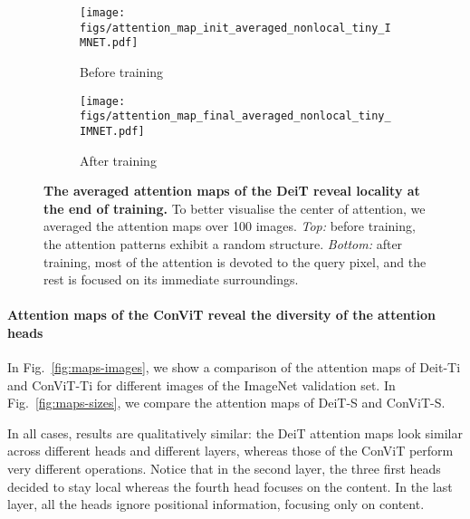 \documentclass[a4paper,11pt,twocolumn]{article}
\begin{document}
\begin{figure}[htb]
    \centering
    \begin{subfigure}[b]{.49\columnwidth}
    \texttt{[image: figs/attention\_map\_init\_averaged\_nonlocal\_tiny\_IMNET.pdf]}
    \caption{Before training}
    \end{subfigure}
    \begin{subfigure}[b]{.49\columnwidth}
    \texttt{[image: figs/attention\_map\_final\_averaged\_nonlocal\_tiny\_IMNET.pdf]}
    \caption{After training}
    \end{subfigure}
    \caption{\textbf{The averaged attention maps of the DeiT reveal locality at the end of training.} To better visualise the center of attention, we averaged the attention maps over 100 images. \textit{Top:} before training, the attention patterns exhibit a random structure. \textit{Bottom:} after training, most of the attention is devoted to the query pixel, and the rest is focused on its immediate surroundings.}
    \label{fig:attn-nonlocal}
\end{figure}

\paragraph{Attention maps of the ConViT reveal the diversity of the attention heads}

In Fig.~\ref{fig:maps-images}, we show a comparison of the attention maps of Deit-Ti and ConViT-Ti for different images of the ImageNet validation set. In Fig.~\ref{fig:maps-sizes}, we compare the attention maps of DeiT-S and ConViT-S.

In all cases, results are qualitatively similar: the DeiT attention maps look similar across different heads and different layers, whereas those of the ConViT perform very different operations. Notice that in the second layer, the three first heads decided to stay local whereas the fourth head focuses on the content. In the last layer, all the heads ignore positional information, focusing only on content.
\end{document}
